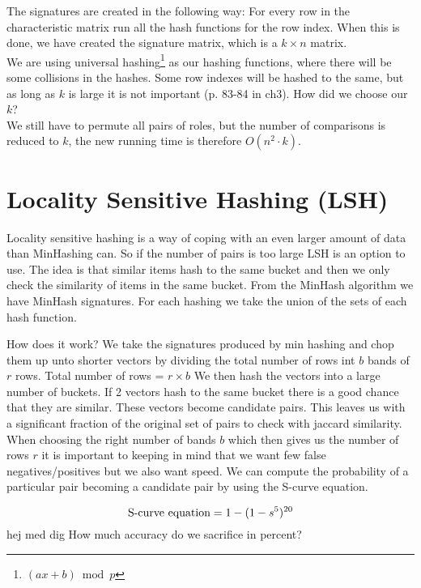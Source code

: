 \documentclass[a4paper,11pt]{article}
\begin{document}
The signatures are created in the following way: For every row in the characteristic matrix run all the hash functions for the row index. When this is done, we have created the signature matrix, which is a $k\times n$ matrix.\\

We are using universal hashing\footnote{$(ax + b) \bmod p$} as our hashing functions, where there will be some collisions in the hashes. Some row indexes will be hashed to the same, but as long as $k$ is large it is not important (p. 83-84 in ch3). How did we choose our $k$? \\

We still have to permute all pairs of roles, but the number of comparisons is reduced to $k$, the new running time is therefore $O(n^2 \cdot k)$.

\section{Locality Sensitive Hashing (LSH)}
Locality sensitive hashing is a way of coping with an even larger amount of data than MinHashing can. So if the number of pairs is too large LSH is an option to use. The idea is that similar items hash to the same bucket and then we only check the similarity of items in the same bucket. From the MinHash algorithm we have MinHash signatures. For each hashing we take the union of the sets of each hash function.

How does it work? We take the signatures produced by min hashing and chop them up unto shorter vectors by dividing the total number of rows int $b$ bands of $r$ rows. Total number of rows = $r\times b$ We then hash the vectors into a large number of buckets. If 2 vectors hash to the same bucket there is a good chance that they are similar. These vectors become candidate pairs. This leaves us with a significant fraction of the original set of pairs to check with jaccard similarity.  \\
When choosing the right number of bands $b$ which then gives us the number of rows $r$ it is important to keeping in mind that we want few false negatives/positives but we also want speed. We can compute the probability of a particular pair becoming a candidate pair by using the S-curve equation.

\begin{equation}
\text {S-curve equation} = 1 - (1 - s^5)^{20}\\ 
\end{equation}
hej med dig
How much accuracy do we sacrifice in percent?\\
\end{document}
